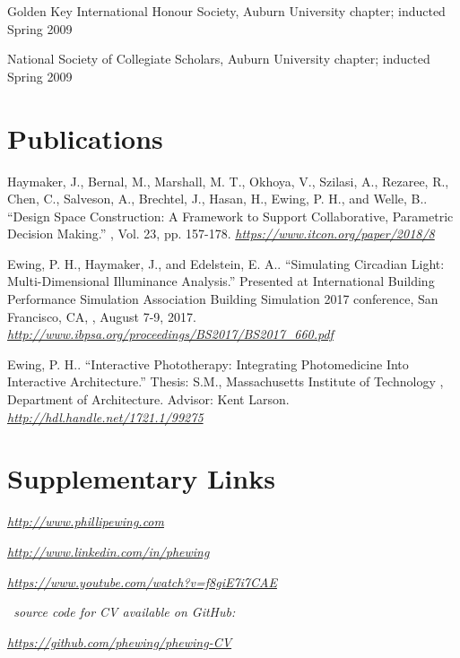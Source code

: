 \documentclass[letterpaper, oneside, 10pt]{article}
\begin{document}
 \DotSep{0.25em} Golden Key International Honour Society, Auburn
University chapter; inducted Spring 2009

 \DotSep{0.25em} National Society of Collegiate Scholars, Auburn
University chapter; inducted Spring 2009



\section*{Publications} %

\hangindent=10pt
Haymaker, J., Bernal, M., Marshall, M. T., Okhoya, V., Szilasi, A., Rezaree,
R., Chen, C., Salveson, A., Brechtel, J., Hasan, H., Ewing, P. H., and Welle,
B.. ``Design Space Construction: A Framework to Support
Collaborative, Parametric Decision Making.'' , Vol. 23, pp. 157-178. 
\textit{\url{https://www.itcon.org/paper/2018/8}}

\hangindent=10pt
Ewing, P. H., Haymaker, J., and Edelstein, E. A.. ``Simulating
Circadian Light: Multi-Dimensional Illuminance Analysis.'' Presented at
International Building Performance Simulation Association  Building
Simulation 2017 conference, San Francisco, CA, , August 7-9, 2017.
 \textit{\url{http://www.ibpsa.org/proceedings/BS2017/BS2017_660.pdf}}

\hangindent=10pt
Ewing, P. H.. ``Interactive Phototherapy: Integrating Photomedicine
Into Interactive Architecture.'' Thesis: S.M., Massachusetts Institute of
Technology , Department of Architecture. Advisor: Kent Larson.
 \textit{\url{http://hdl.handle.net/1721.1/99275}}

\section*{Supplementary Links} %

\DotSep{0.25em}
\textit{\url{http://www.phillipewing.com}}

\DotSep{0.25em}
\textit{\url{http://www.linkedin.com/in/phewing}}

\DotSep{0.25em}
\textit{\url{https://www.youtube.com/watch?v=f8giE7i7CAE}}

\vfill

\begin{center}

  \textit{\LaTeXe\ source code for CV available on GitHub:}

  \textit{\url{https://github.com/phewing/phewing-CV}}

\end{center}
\end{document}
